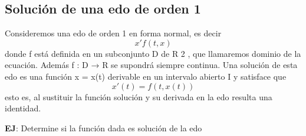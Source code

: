 \documentclass{book}
\begin{document}
    \subsection{Solución de una edo de orden 1}
    Consideremos una edo de orden 1 en forma normal, es decir
    \begin{equation*}
        x'f(t,x)
    \end{equation*}
    donde f está definida en un subconjunto D de R 2 , que llamaremos
    dominio de la ecuación. Además f : D → R se supondrá siempre
    continua.
    Una solución de esta edo es una función x = x(t) derivable en un
    intervalo abierto I y satisface que
    \begin{equation*}
        x'(t)=f(t,x(t))
    \end{equation*}
    esto es, al sustituir la función solución y su derivada en la edo resulta una
    identidad.
    \newpage

    \textbf{EJ}: Determine si la función dada es solución de la edo
\end{document}
